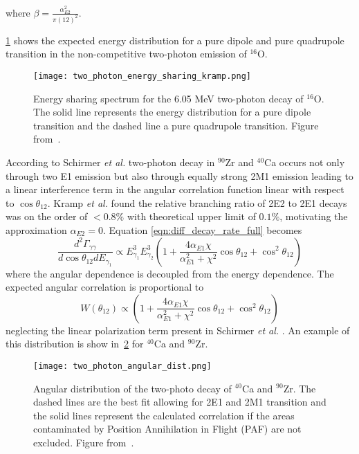 \documentclass[cnatzke_thesis_proposal.tex]{subfiles}
\begin{document}
where $\beta = \frac{\alpha_{E2}^2}{\pi (12)^2}$.

\ref{fig:two_photon_energy_sharing_kramp} shows the expected energy distribution for a pure dipole and pure quadrupole transition in the non-competitive two-photon emission of $^{16}$O.

\begin{figure}[htbp]
    \centering
    \texttt{[image: two\_photon\_energy\_sharing\_kramp.png]}
    \caption{Energy sharing spectrum for the 6.05 MeV two-photon decay of $^{16}$O. The solid line represents the energy distribution for a pure dipole transition and the dashed line a pure quadrupole transition. Figure from~\cite{kramp_nuclear_1987}.}
    \label{fig:two_photon_energy_sharing_kramp}
\end{figure}
  
According to Schirmer \textit{et al.} two-photon decay in $^{90}$Zr and $^{40}$Ca occurs not only through two E1 emission but also through equally strong 2M1 emission leading to a linear interference term in the angular correlation function linear with respect to $\cos\theta_{12}$. 
Kramp \textit{et al.} found the relative branching ratio of 2E2 to 2E1 decays was on the order of $<0.8\%$ with theoretical upper limit of $0.1\%$, motivating the approximation $\alpha_{E2} = 0$.
Equation \ref{eqn:diff_decay_rate_full} becomes 
\begin{equation}
    \frac{d^2\Gamma_{\gamma\gamma}}{d \cos\theta_{12} dE_{\gamma_1}} \propto E_{\gamma_1}^3 E_{\gamma_2}^3 \left( 1 + \frac{4 \alpha_{E1} \chi}{\alpha_{E1}^2 + \chi^2} \cos\theta_{12} +  \cos^2\theta_{12} \right)
\end{equation}
where the angular dependence is decoupled from the energy dependence. 
The expected angular correlation is proportional to
\begin{equation} \label{eqn:angular-distribution}
   W(\theta_{12}) \propto \left( 1 + \frac{4 \alpha_{E1} \chi}{\alpha_{E1}^2 + \chi^2} \cos\theta_{12} +  \cos^2\theta_{12} \right)
\end{equation}
neglecting the linear polarization term present in Schirmer \textit{et al.} \cite{schirmer_double_1984}.
An example of this distribution is show in~\ref{fig:two_photon_angular_dist} for $^{40}$Ca and $^{90}$Zr.

\begin{figure}[htbp]
    \centering
    \texttt{[image: two\_photon\_angular\_dist.png]}
    \caption{Angular distribution of the two-photo decay of $^{40}$Ca and $^{90}$Zr. The dashed lines are the best fit allowing for 2E1 and 2M1 transition and the solid lines represent the calculated correlation if the areas contaminated by Position Annihilation in Flight (PAF) are not excluded. Figure from~\cite{schirmer_double_1984}.}
    \label{fig:two_photon_angular_dist}
\end{figure}
\end{document}
